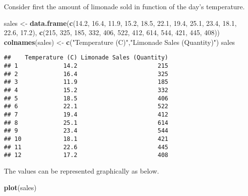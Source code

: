 \documentclass[]{article}
\newenvironment{Shaded}{\begin{snugshade}}{\end{snugshade}}
\newcommand{\KeywordTok}[1]{\textcolor[rgb]{0.13,0.29,0.53}{\textbf{#1}}}
\newcommand{\DecValTok}[1]{\textcolor[rgb]{0.00,0.00,0.81}{#1}}
\newcommand{\FloatTok}[1]{\textcolor[rgb]{0.00,0.00,0.81}{#1}}
\newcommand{\StringTok}[1]{\textcolor[rgb]{0.31,0.60,0.02}{#1}}
\newcommand{\NormalTok}[1]{#1}
\begin{document}
Consider first the amount of limonade sold in function of the day's
temperature.

\begin{Shaded}
\begin{Highlighting}[]
\NormalTok{sales <-}\StringTok{ }\KeywordTok{data.frame}\NormalTok{(}\KeywordTok{c}\NormalTok{(}\FloatTok{14.2}\NormalTok{, }\FloatTok{16.4}\NormalTok{, }\FloatTok{11.9}\NormalTok{, }\FloatTok{15.2}\NormalTok{, }\FloatTok{18.5}\NormalTok{, }\FloatTok{22.1}\NormalTok{, }\FloatTok{19.4}\NormalTok{, }\FloatTok{25.1}\NormalTok{, }\FloatTok{23.4}\NormalTok{, }\FloatTok{18.1}\NormalTok{, }\FloatTok{22.6}\NormalTok{, }\FloatTok{17.2}\NormalTok{),}
                    \KeywordTok{c}\NormalTok{(}\DecValTok{215}\NormalTok{, }\DecValTok{325}\NormalTok{, }\DecValTok{185}\NormalTok{, }\DecValTok{332}\NormalTok{, }\DecValTok{406}\NormalTok{, }\DecValTok{522}\NormalTok{, }\DecValTok{412}\NormalTok{, }\DecValTok{614}\NormalTok{, }\DecValTok{544}\NormalTok{, }\DecValTok{421}\NormalTok{, }\DecValTok{445}\NormalTok{, }\DecValTok{408}\NormalTok{))}
\KeywordTok{colnames}\NormalTok{(sales) <-}\StringTok{ }\KeywordTok{c}\NormalTok{(}\StringTok{"Temperature (C)"}\NormalTok{,}\StringTok{"Limonade Sales (Quantity)"}\NormalTok{)}
\NormalTok{sales}
\end{Highlighting}
\end{Shaded}

\begin{verbatim}
##    Temperature (C) Limonade Sales (Quantity)
## 1             14.2                       215
## 2             16.4                       325
## 3             11.9                       185
## 4             15.2                       332
## 5             18.5                       406
## 6             22.1                       522
## 7             19.4                       412
## 8             25.1                       614
## 9             23.4                       544
## 10            18.1                       421
## 11            22.6                       445
## 12            17.2                       408
\end{verbatim}

The values can be represented graphically as below.

\begin{Shaded}
\begin{Highlighting}[]
\KeywordTok{plot}\NormalTok{(sales)}
\end{Highlighting}
\end{Shaded}
\end{document}
